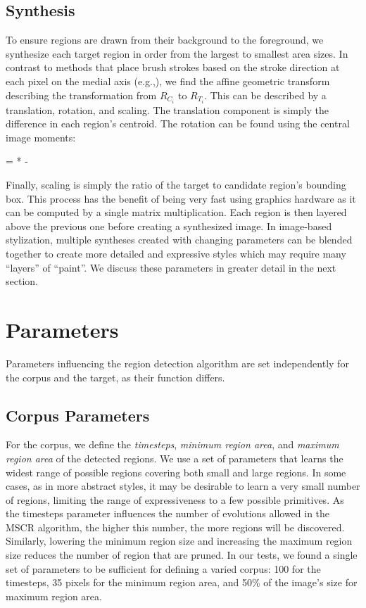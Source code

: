 \documentclass[a4paper,10pt,final]{ThesisStyle}
\begin{document}
\subsection{Synthesis}\vspace{-0.4em}
To ensure regions are drawn from their background to the foreground, we synthesize each target region in order from the largest to smallest area sizes.  In contrast to methods that place brush strokes based on the stroke direction at each pixel on the medial axis (e.g.,\cite{Wang2004a}), we find the affine geometric transform describing the transformation from $R_{C_i}$ to $R_{T_i}$.  This can be described by a translation, rotation, and scaling.  The translation component is simply the difference in each region's centroid.  The rotation can be found using the central image moments: 
\begin{equationb}
\Theta =  * \arctan  {} {  -  }
\end{equationb}
Finally, scaling is simply the ratio of the target to candidate region's bounding box.  This process has the benefit of being very fast using graphics hardware as it can be computed by a single matrix multiplication.  Each region is then layered above the previous one before creating a synthesized image.  In image-based stylization, multiple syntheses created with changing parameters can be blended together to create more detailed and expressive styles which may require many ``layers'' of ``paint''.  We discuss these parameters in greater detail in the next section.
\section{Parameters}  
Parameters influencing the region detection algorithm are set independently for the corpus and the target, as their function differs.
\subsection{Corpus Parameters}\vspace{-0.4em}
\label{sec:parameters}
For the corpus, we define the \textit{timesteps}, \textit{minimum region area}, and \textit{maximum region area} of the detected regions.  We use a set of parameters that learns the widest range of possible regions covering both small and large regions.  In some cases, as in more abstract styles, it may be desirable to learn a very small number of regions, limiting the range of expressiveness to a few possible primitives.  As the timesteps parameter influences the number of evolutions allowed in the MSCR algorithm, the higher this number, the more regions will be discovered.  Similarly, lowering the minimum region size and increasing the maximum region size reduces the number of region that are pruned.  In our tests, we found a single set of parameters to be sufficient for defining a varied corpus: 100 for the timesteps, 35 pixels for the minimum region area, and 50\% of the image's size for maximum region area.
\end{document}
